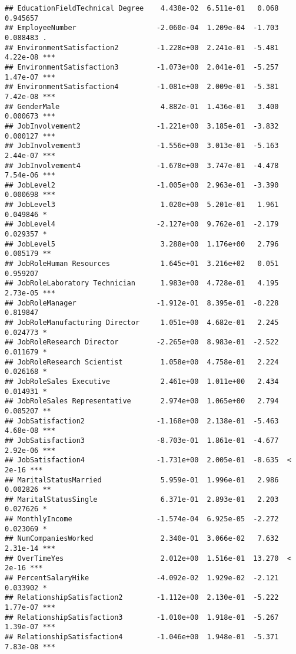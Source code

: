 \documentclass[
]{article}
\begin{document}
\begin{verbatim}
## EducationFieldTechnical Degree    4.438e-02  6.511e-01   0.068 0.945657    
## EmployeeNumber                   -2.060e-04  1.209e-04  -1.703 0.088483 .  
## EnvironmentSatisfaction2         -1.228e+00  2.241e-01  -5.481 4.22e-08 ***
## EnvironmentSatisfaction3         -1.073e+00  2.041e-01  -5.257 1.47e-07 ***
## EnvironmentSatisfaction4         -1.081e+00  2.009e-01  -5.381 7.42e-08 ***
## GenderMale                        4.882e-01  1.436e-01   3.400 0.000673 ***
## JobInvolvement2                  -1.221e+00  3.185e-01  -3.832 0.000127 ***
## JobInvolvement3                  -1.556e+00  3.013e-01  -5.163 2.44e-07 ***
## JobInvolvement4                  -1.678e+00  3.747e-01  -4.478 7.54e-06 ***
## JobLevel2                        -1.005e+00  2.963e-01  -3.390 0.000698 ***
## JobLevel3                         1.020e+00  5.201e-01   1.961 0.049846 *  
## JobLevel4                        -2.127e+00  9.762e-01  -2.179 0.029357 *  
## JobLevel5                         3.288e+00  1.176e+00   2.796 0.005179 ** 
## JobRoleHuman Resources            1.645e+01  3.216e+02   0.051 0.959207    
## JobRoleLaboratory Technician      1.983e+00  4.728e-01   4.195 2.73e-05 ***
## JobRoleManager                   -1.912e-01  8.395e-01  -0.228 0.819847    
## JobRoleManufacturing Director     1.051e+00  4.682e-01   2.245 0.024773 *  
## JobRoleResearch Director         -2.265e+00  8.983e-01  -2.522 0.011679 *  
## JobRoleResearch Scientist         1.058e+00  4.758e-01   2.224 0.026168 *  
## JobRoleSales Executive            2.461e+00  1.011e+00   2.434 0.014931 *  
## JobRoleSales Representative       2.974e+00  1.065e+00   2.794 0.005207 ** 
## JobSatisfaction2                 -1.168e+00  2.138e-01  -5.463 4.68e-08 ***
## JobSatisfaction3                 -8.703e-01  1.861e-01  -4.677 2.92e-06 ***
## JobSatisfaction4                 -1.731e+00  2.005e-01  -8.635  < 2e-16 ***
## MaritalStatusMarried              5.959e-01  1.996e-01   2.986 0.002826 ** 
## MaritalStatusSingle               6.371e-01  2.893e-01   2.203 0.027626 *  
## MonthlyIncome                    -1.574e-04  6.925e-05  -2.272 0.023069 *  
## NumCompaniesWorked                2.340e-01  3.066e-02   7.632 2.31e-14 ***
## OverTimeYes                       2.012e+00  1.516e-01  13.270  < 2e-16 ***
## PercentSalaryHike                -4.092e-02  1.929e-02  -2.121 0.033902 *  
## RelationshipSatisfaction2        -1.112e+00  2.130e-01  -5.222 1.77e-07 ***
## RelationshipSatisfaction3        -1.010e+00  1.918e-01  -5.267 1.39e-07 ***
## RelationshipSatisfaction4        -1.046e+00  1.948e-01  -5.371 7.83e-08 ***

\end{verbatim}
\end{document}
